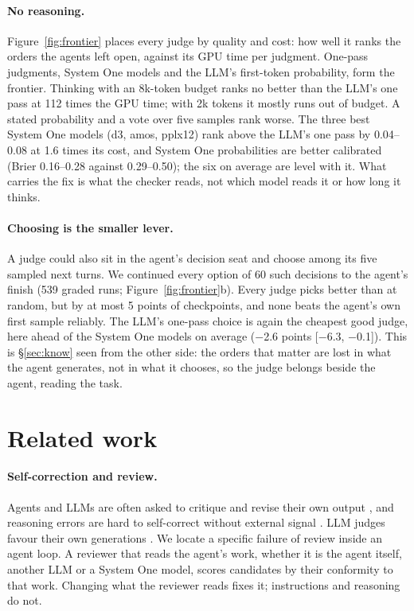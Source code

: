 \documentclass[11pt]{article}
\begin{document}
\paragraph{No reasoning.} Figure~\ref{fig:frontier} places every judge by quality and cost: how well it ranks the
orders the agents left open, against its GPU time per judgment. One-pass judgments, System One models and the LLM's
first-token probability, form the frontier. Thinking with an 8k-token budget ranks no better than the LLM's one pass
at 112 times the GPU time; with 2k tokens it mostly runs out of budget. A stated probability and a vote over five
samples rank worse. The three best System One models (d3, amos, pplx12) rank above the LLM's one pass by 0.04--0.08 at
1.6 times its cost, and System One probabilities are better calibrated (Brier 0.16--0.28 against 0.29--0.50); the six
on average are level with it. What carries the fix is what the checker reads, not which model reads it or how long
it thinks.

\paragraph{Choosing is the smaller lever.} A judge could also sit in the agent's decision seat and choose among its
five sampled next turns. We continued every option of 60 such decisions to the agent's finish (539 graded runs;
Figure~\ref{fig:frontier}b). Every judge picks better than at random, but by at most 5 points of checkpoints, and none
beats the agent's own first sample reliably. The LLM's one-pass choice is again the cheapest good judge, here ahead of
the System One models on average ($-$2.6 points [$-$6.3, $-$0.1]). This is \S\ref{sec:know} seen from the other side:
the orders that matter are lost in what the agent generates, not in what it chooses, so the judge belongs beside the
agent, reading the task.

\section{Related work}

\paragraph{Self-correction and review.} Agents and LLMs are often asked to critique and revise their own output
\citep{madaan2023selfrefine,shinn2023reflexion}, and reasoning errors are hard to self-correct without external
signal \citep{huang2024cannot}. LLM judges favour their own generations \citep{panickssery2024selfpref}. We locate a
specific failure of review inside an agent loop. A reviewer that reads the agent's work, whether it is the agent
itself, another LLM or a System One model, scores candidates by their conformity to that work. Changing what the
reviewer reads fixes it; instructions and reasoning do not.
\end{document}
